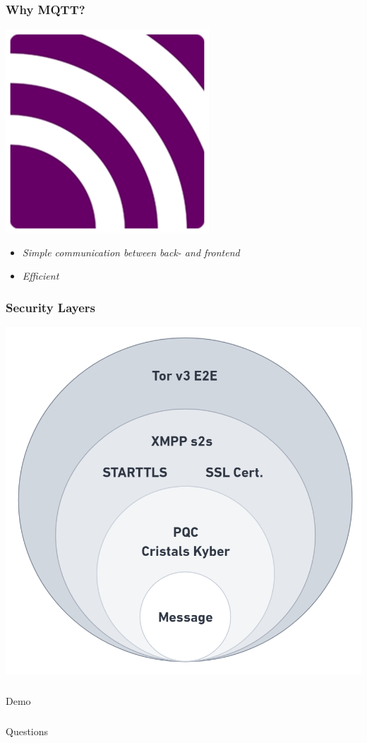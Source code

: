 \documentclass{beamer}
\begin{document}
\begin{frame}
	\frametitle{Why MQTT?}
    \begin{center}
	\includegraphics[scale=0.1]{resources/mqtt.png}
    \end{center}
	\begin{itemize}
		\item \textit{Simple communication between back- and frontend}
		\item \textit{Efficient}
	\end{itemize}
\end{frame}

\begin{frame}
    \frametitle{Security Layers}
    \begin{center}
        \includegraphics[scale=0.3]{resources/securitylayers.png}
    \end{center}
\end{frame}


\begin{frame}
    \frametitle{ }
    \centering
    \Huge Demo
\end{frame}

\begin{frame}
    \frametitle{ }
    \centering
    \Huge Questions
\end{frame}
\end{document}
